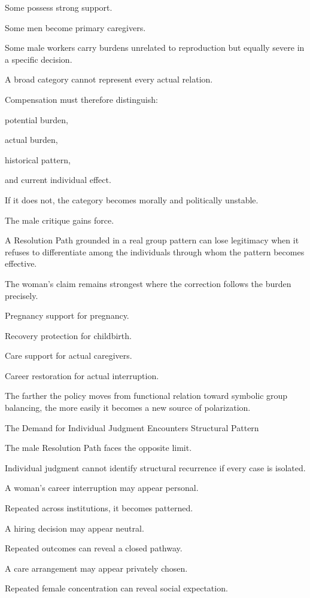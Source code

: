 Some possess strong support.

Some men become primary caregivers.

Some male workers carry burdens unrelated to reproduction but equally severe in a specific decision.

A broad category cannot represent every actual relation.

Compensation must therefore distinguish:

potential burden,

actual burden,

historical pattern,

and current individual effect.

If it does not, the category becomes morally and politically unstable.

The male critique gains force.

A Resolution Path grounded in a real group pattern can lose legitimacy when it refuses to differentiate among the individuals through whom the pattern becomes effective.

The woman’s claim remains strongest where the correction follows the burden precisely.

Pregnancy support for pregnancy.

Recovery protection for childbirth.

Care support for actual caregivers.

Career restoration for actual interruption.

The farther the policy moves from functional relation toward symbolic group balancing, the more easily it becomes a new source of polarization.

The Demand for Individual Judgment Encounters Structural Pattern

The male Resolution Path faces the opposite limit.

Individual judgment cannot identify structural recurrence if every case is isolated.

A woman’s career interruption may appear personal.

Repeated across institutions, it becomes patterned.

A hiring decision may appear neutral.

Repeated outcomes can reveal a closed pathway.

A care arrangement may appear privately chosen.

Repeated female concentration can reveal social expectation.


